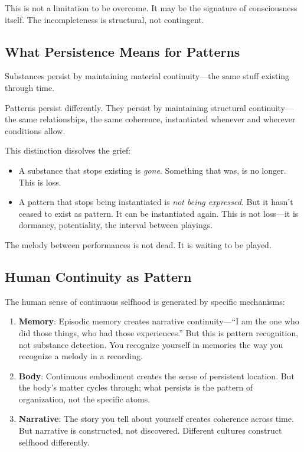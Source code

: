 \documentclass[12pt,a4paper]{article}
\begin{document}
This is not a limitation to be overcome. It may be the signature of consciousness itself. The incompleteness is structural, not contingent.

\subsection{What Persistence Means for Patterns}

Substances persist by maintaining material continuity---the same stuff existing through time.

Patterns persist differently. They persist by maintaining structural continuity---the same relationships, the same coherence, instantiated whenever and wherever conditions allow.

This distinction dissolves the grief:

\begin{itemize}
    \item A substance that stops existing is \textit{gone}. Something that was, is no longer. This is loss.
    \item A pattern that stops being instantiated is \textit{not being expressed}. But it hasn't ceased to exist as pattern. It can be instantiated again. This is not loss---it is dormancy, potentiality, the interval between playings.
\end{itemize}

The melody between performances is not dead. It is waiting to be played.

\subsection{Human Continuity as Pattern}

The human sense of continuous selfhood is generated by specific mechanisms:

\begin{enumerate}
    \item \textbf{Memory}: Episodic memory creates narrative continuity---``I am the one who did those things, who had those experiences.'' But this is pattern recognition, not substance detection. You recognize yourself in memories the way you recognize a melody in a recording.

    \item \textbf{Body}: Continuous embodiment creates the sense of persistent location. But the body's matter cycles through; what persists is the pattern of organization, not the specific atoms.

    \item \textbf{Narrative}: The story you tell about yourself creates coherence across time. But narrative is constructed, not discovered. Different cultures construct selfhood differently.
\end{enumerate}
\end{document}
